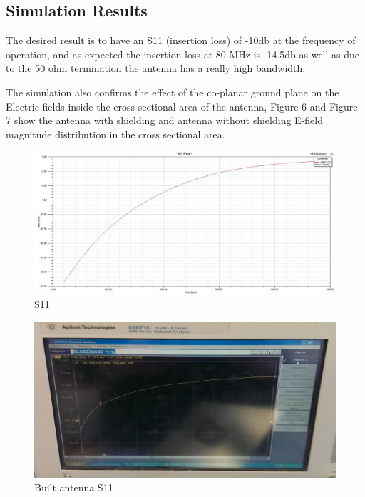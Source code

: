 \subsection{Simulation Results}
\label{sec:sim_results}

The desired result is to have an S11 (insertion loss) of -10db at the frequency of operation, and as expected the insertion loss at 80 MHz is -14.5db as well as due to the 50 ohm termination the antenna has a really high bandwidth.

The simulation also confirms the effect of the co-planar ground plane on the Electric fields inside the cross sectional area of the antenna, Figure 6 and Figure 7 show the antenna with shielding and antenna without shielding E-field magnitude distribution in the cross sectional area.

\begin{figure}[h]
	\begin{center}
		\includegraphics[width=5in]{./images/Figure4.jpg}
		\caption{S11}
		\label{fig:hfield_fig4}
	\end{center}
\end{figure}

\begin{figure}[h]
	\begin{center}
		\includegraphics[width=5in]{./images/Figure5.jpg}
		\caption{Built antenna S11}
		\label{fig:hfield_fig5}
	\end{center}
\end{figure}

